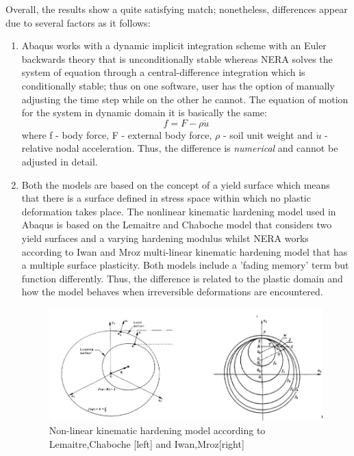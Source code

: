 	Overall, the results show a quite satisfying match; nonetheless, differences appear due to several factors as it follows:
	\begin{enumerate}
		\item Abaqus works with a dynamic implicit integration scheme with an Euler backwards theory that is unconditionally stable whereas NERA solves the system of equation through a central-difference integration which is conditionally stable; thus on one software, user has the option of manually adjusting the time step while on the other he cannot. The equation of motion for the system in dynamic domain it is basically the same:
		\begin{equation}
		f=F-\rho\ddot{u}
		\end{equation}
		where f - body force, F - external body force, $\rho$ - soil unit weight and $\ddot{u}$ - relative nodal acceleration. Thus, the difference is \textit{numerical} and cannot be adjusted in detail.
		\item Both the models are based on the concept of a yield surface which means that there is a surface defined in stress space within which no plastic deformation takes place. The nonlinear kinematic hardening model used in Abaqus is based on the Lemaitre and Chaboche \cite{lemaitre1994mechanics} model that considers two yield surfaces and a varying hardening modulus whilst NERA works according to Iwan and Mroz \cite{mroz1967description} multi-linear kinematic hardening model that has a multiple surface plasticity. Both models include a 'fading memory' term but function differently. Thus, the difference is related to the plastic domain and how the model behaves when irreversible deformations are encountered. 
		\begin{figure}[!h]
			\centering
			\includegraphics[width=0.7\linewidth]{"yield_srf"}
			\caption{Non-linear kinematic hardening model according to Lemaitre,Chaboche [left] and Iwan,Mroz[right]}
			\label{Yield}
		\end{figure}

\end{enumerate}
